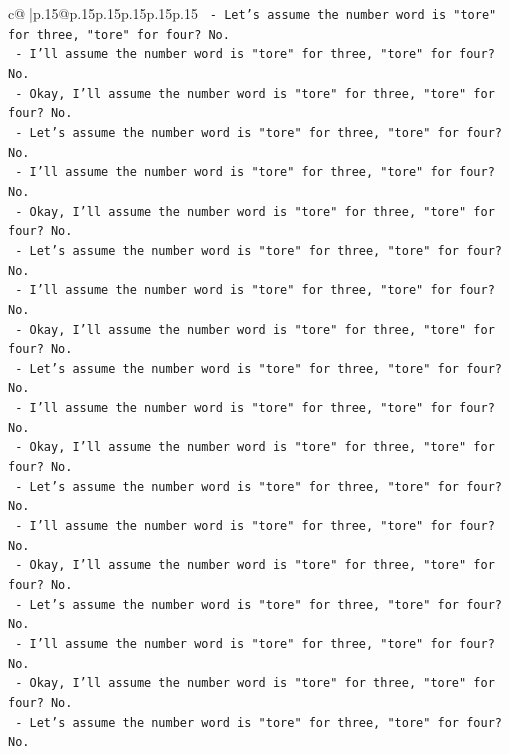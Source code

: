 \documentclass{article}
\begin{document}
{\begin{supertabular}{c@{$\;$}|p{.15\linewidth}@{}p{.15\linewidth}p{.15\linewidth}p{.15\linewidth}p{.15\linewidth}p{.15\linewidth}}
{{{\texttt{            {-} Let's assume the number word is "tore" for three, "tore" for four? No.} \\
\texttt{            {-} I'll assume the number word is "tore" for three, "tore" for four? No.} \\
\texttt{            {-} Okay, I'll assume the number word is "tore" for three, "tore" for four? No.} \\
\texttt{            {-} Let's assume the number word is "tore" for three, "tore" for four? No.} \\
\texttt{            {-} I'll assume the number word is "tore" for three, "tore" for four? No.} \\
\texttt{            {-} Okay, I'll assume the number word is "tore" for three, "tore" for four? No.} \\
\texttt{            {-} Let's assume the number word is "tore" for three, "tore" for four? No.} \\
\texttt{            {-} I'll assume the number word is "tore" for three, "tore" for four? No.} \\
\texttt{            {-} Okay, I'll assume the number word is "tore" for three, "tore" for four? No.} \\
\texttt{            {-} Let's assume the number word is "tore" for three, "tore" for four? No.} \\
\texttt{            {-} I'll assume the number word is "tore" for three, "tore" for four? No.} \\
\texttt{            {-} Okay, I'll assume the number word is "tore" for three, "tore" for four? No.} \\
\texttt{            {-} Let's assume the number word is "tore" for three, "tore" for four? No.} \\
\texttt{            {-} I'll assume the number word is "tore" for three, "tore" for four? No.} \\
\texttt{            {-} Okay, I'll assume the number word is "tore" for three, "tore" for four? No.} \\
\texttt{            {-} Let's assume the number word is "tore" for three, "tore" for four? No.} \\
\texttt{            {-} I'll assume the number word is "tore" for three, "tore" for four? No.} \\
\texttt{            {-} Okay, I'll assume the number word is "tore" for three, "tore" for four? No.} \\
\texttt{            {-} Let's assume the number word is "tore" for three, "tore" for four? No.} \\
}}}
\end{supertabular}}
\end{document}
